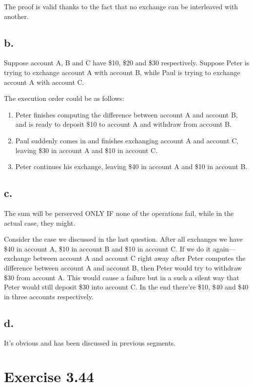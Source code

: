 \documentclass[../main.tex]{subfiles}
\begin{document}
The proof is valid thanks to the fact that no exchange can be interleaved with another.

\subsection{b.}

Suppose account A, B and C have \$10, \$20 and \$30 respectively. Suppose Peter is trying to exchange account A with account B, while Paul is trying to exchange account A with account C.

The execution order could be as follows:

\begin{enumerate}
\item Peter finishes computing the difference between account A and account B, and is ready to deposit \$10 to account A and withdraw from account B.
\item Paul suddenly comes in and finishes exchanging account A and account C, leaving \$30 in account A and \$10 in account C.
\item Peter continues his exchange, leaving \$40 in account A and \$10 in account B.
\end{enumerate}

\subsection{c.}

The sum will be perserved ONLY IF none of the operations fail, while in the actual case, they might.

Consider the case we discussed in the last question. After all exchanges we have \$40 in account A, \$10 in account B and \$10 in account C. If we do it again---exchange between account A and account C right away after Peter computes the difference between account A and account B, then Peter would try to withdraw \$30 from account A. This would cause a failure but in a such a silent way that Peter would still deposit \$30 into account C. In the end there're \$10, \$40 and \$40 in three accounts respectively.

\subsection{d.}

It's obvious and has been discussed in previous segments.

\section{Exercise 3.44}
\end{document}

